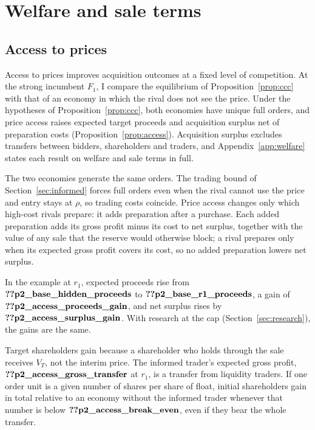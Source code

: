 \section{Welfare and sale terms}\label{sec:welfare}

\subsection{Access to prices}\label{sec:access}

Access to prices improves acquisition outcomes at a fixed level of competition. At the strong incumbent
\(F_1\), I compare the equilibrium of Proposition~\ref{prop:ccc} with that of an economy in which the
rival does not see the price. Under the hypotheses of Proposition~\ref{prop:ccc}, both economies have unique full orders, and price access
raises expected target proceeds and acquisition surplus net of preparation costs
(Proposition~\ref{prop:access}).
Acquisition surplus excludes transfers between bidders, shareholders and traders, and
Appendix~\ref{app:welfare} states each result on welfare and sale terms in full.

The two economies generate the same orders. The trading bound of Section~\ref{sec:informed} forces full orders even
when the rival cannot use the price and entry stays at \(\rho\), so trading costs coincide. Price access
changes only which high-cost rivals prepare: it adds preparation after a purchase. Each added preparation
adds its gross profit minus its cost to net surplus, together with the value of any sale that the reserve
would otherwise block; a rival prepares only when its expected gross profit covers its cost, so no
added preparation lowers net surplus.

In the example at \(r_1\), expected proceeds rise from \(\reg{p2_base_hidden_proceeds}\) to
\(\reg{p2_base_r1_proceeds}\), a gain of \(\reg{p2_access_proceeds_gain}\), and net surplus rises by
\(\reg{p2_access_surplus_gain}\). With research at the cap (Section~\ref{sec:research}), the
gains are the same.

Target shareholders gain because a shareholder who holds through the sale receives \(V_T\), not the interim price.
The informed trader's expected gross profit, \(\reg{p2_access_gross_transfer}\) at \(r_1\), is a transfer from
liquidity traders. If one order unit is a given number of shares per share of float, initial shareholders gain in
total relative to an economy without the informed trader whenever that number is below \(\reg{p2_access_break_even}\), even if
they bear the whole transfer.

